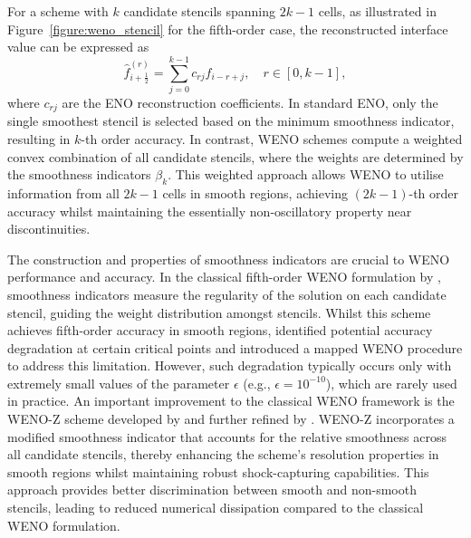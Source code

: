 For a scheme with $k$ candidate stencils spanning $2k-1$ cells, as illustrated in Figure~\ref{figure:weno_stencil} for the fifth-order case, the reconstructed interface value can be expressed as
\begin{equation}
\hat{f}_{i+\frac{1}{2}}^{(r)} = \sum_{j=0}^{k-1} c_{rj} f_{i-r+j}, \quad r \in [0, k-1],
\end{equation}
where $c_{rj}$ are the ENO reconstruction coefficients. In standard ENO, only the single smoothest stencil is selected based on the minimum smoothness indicator, resulting in $k$-th order accuracy. In contrast, WENO schemes compute a weighted convex combination of all candidate stencils, where the weights are determined by the smoothness indicators $\beta_k$. This weighted approach allows WENO to utilise information from all $2k-1$ cells in smooth regions, achieving $(2k-1)$-th order accuracy whilst maintaining the essentially non-oscillatory property near discontinuities.

The construction and properties of smoothness indicators are crucial to WENO performance and accuracy. In the classical fifth-order WENO formulation by \citet{JiangShu1996}, smoothness indicators measure the regularity of the solution on each candidate stencil, guiding the weight distribution amongst stencils. Whilst this scheme achieves fifth-order accuracy in smooth regions, \citet{HenrickEtAl2005} identified potential accuracy degradation at certain critical points and introduced a mapped WENO procedure to address this limitation. However, such degradation typically occurs only with extremely small values of the parameter $\epsilon$ (e.g., $\epsilon = 10^{-10}$), which are rarely used in practice. An important improvement to the classical WENO framework is the WENO-Z scheme developed by \citet{BorgesEtAl2008} and further refined by \citet{CastroEtAl2011}. WENO-Z incorporates a modified smoothness indicator that accounts for the relative smoothness across all candidate stencils, thereby enhancing the scheme's resolution properties in smooth regions whilst maintaining robust shock-capturing capabilities. This approach provides better discrimination between smooth and non-smooth stencils, leading to reduced numerical dissipation compared to the classical WENO formulation.

